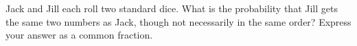 Jack and Jill each roll two standard dice. What is the probability that Jill gets the same two numbers as Jack, though not necessarily in the same order? Express your answer as a common fraction.
